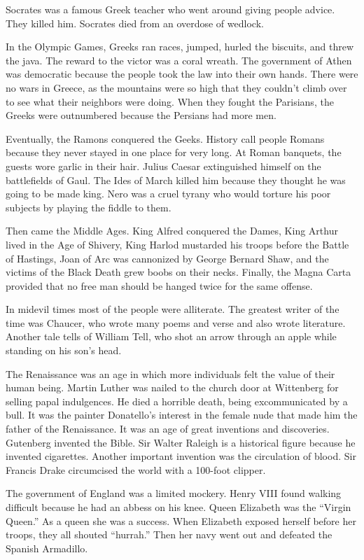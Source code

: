 Socrates was a famous Greek teacher who went around giving people
advice. They killed him. Socrates died from an overdose of wedlock.

In the Olympic Games, Greeks ran races, jumped, hurled the biscuits,
and threw the java. The reward to the victor was a coral wreath. The
government of Athen was democratic because the people took the law
into their own hands. There were no wars in Greece, as the mountains
were so high that they couldn't climb over to see what their neighbors
were doing. When they fought the Parisians, the Greeks were
outnumbered because the Persians had more men.

Eventually, the Ramons conquered the Geeks. History call people Romans
because they never stayed in one place for very long. At Roman
banquets, the guests wore garlic in their hair. Julius Caesar
extinguished himself on the battlefields of Gaul. The Ides of March
killed him because they thought he was going to be made king. Nero was
a cruel tyrany who would torture his poor subjects by playing the
fiddle to them.

Then came the Middle Ages. King Alfred conquered the Dames, King
Arthur lived in the Age of Shivery, King Harlod mustarded his troops
before the Battle of Hastings, Joan of Arc was cannonized by George
Bernard Shaw, and the victims of the Black Death grew boobs on their
necks. Finally, the Magna Carta provided that no free man should be
hanged twice for the same offense.

In midevil times most of the people were alliterate. The greatest
writer of the time was Chaucer, who wrote many poems and verse and
also wrote literature. Another tale tells of William Tell, who shot
an arrow through an apple while standing on his son's head.

The Renaissance was an age in which more individuals felt the value of
their human being. Martin Luther was nailed to the church door at
Wittenberg for selling papal indulgences. He died a horrible death,
being excommunicated by a bull. It was the painter Donatello's
interest in the female nude that made him the father of the
Renaissance. It was an age of great inventions and
discoveries. Gutenberg invented the Bible. Sir Walter Raleigh is a
historical figure because he invented cigarettes. Another important
invention was the circulation of blood. Sir Francis Drake circumcised
the world with a 100-foot clipper.

The government of England was a limited mockery. Henry VIII found
walking difficult because he had an abbess on his knee. Queen
Elizabeth was the ``Virgin Queen.'' As a queen she was a success. When
Elizabeth exposed herself before her troops, they all shouted
``hurrah.'' Then her navy went out and defeated the Spanish Armadillo.

